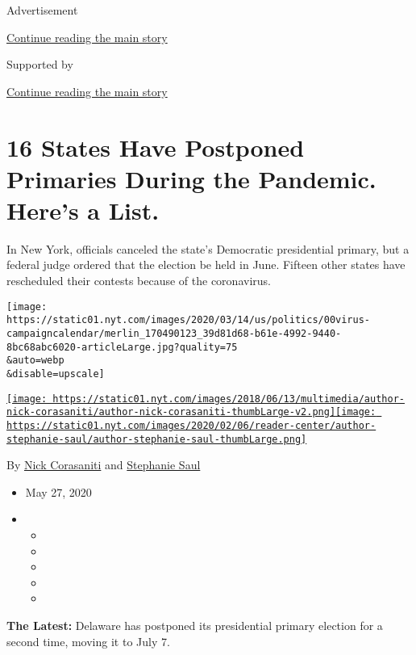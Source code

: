 Advertisement

\protect\hyperlink{after-top}{Continue reading the main story}

Supported by

\protect\hyperlink{after-sponsor}{Continue reading the main story}

\hypertarget{16-states-have-postponed-primaries-during-the-pandemic-heres-a-list}{%
\section{16 States Have Postponed Primaries During the Pandemic. Here's
a
List.}\label{16-states-have-postponed-primaries-during-the-pandemic-heres-a-list}}

In New York, officials canceled the state's Democratic presidential
primary, but a federal judge ordered that the election be held in June.
Fifteen other states have rescheduled their contests because of the
coronavirus.

\texttt{[image: https://static01.nyt.com/images/2020/03/14/us/politics/00virus-campaigncalendar/merlin\_170490123\_39d81d68-b61e-4992-9440-8bc68abc6020-articleLarge.jpg?quality=75\\\&auto=webp\\\&disable=upscale]}

\href{https://www.nytimes.com/by/nick-corasaniti}{\texttt{[image: https://static01.nyt.com/images/2018/06/13/multimedia/author-nick-corasaniti/author-nick-corasaniti-thumbLarge-v2.png]}}\href{https://www.nytimes.com/by/stephanie-saul}{\texttt{[image: https://static01.nyt.com/images/2020/02/06/reader-center/author-stephanie-saul/author-stephanie-saul-thumbLarge.png]}}

By \href{https://www.nytimes.com/by/nick-corasaniti}{Nick Corasaniti}
and \href{https://www.nytimes.com/by/stephanie-saul}{Stephanie Saul}

\begin{itemize}
\item
  May 27, 2020
\item
  \begin{itemize}
  \item
  \item
  \item
  \item
  \item
  \end{itemize}
\end{itemize}

\textbf{The Latest:} Delaware has postponed its presidential primary
election for a second time, moving it to July 7.

